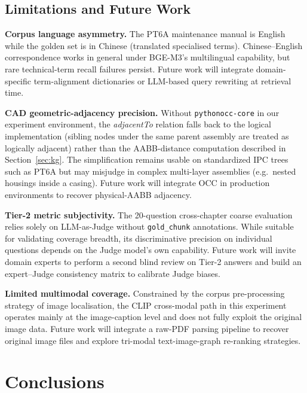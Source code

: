\documentclass[applsci,article,submit,pdftex,moreauthors]{Definitions/mdpi}
\begin{document}
\subsection{Limitations and Future Work}
\label{sec:disc-limit}

\textbf{Corpus language asymmetry.} The PT6A maintenance manual is English while the golden set is in Chinese (translated specialised terms). Chinese--English correspondence works in general under BGE-M3's multilingual capability, but rare technical-term recall failures persist. Future work will integrate domain-specific term-alignment dictionaries or LLM-based query rewriting at retrieval time.

\textbf{CAD geometric-adjacency precision.} Without \texttt{pythonocc-core} in our experiment environment, the \textit{adjacentTo} relation falls back to the logical implementation (sibling nodes under the same parent assembly are treated as logically adjacent) rather than the AABB-distance computation described in Section~\ref{sec:kg}. The simplification remains usable on standardized IPC trees such as PT6A but may misjudge in complex multi-layer assemblies (e.g.\ nested housings inside a casing). Future work will integrate OCC in production environments to recover physical-AABB adjacency.

\textbf{Tier-2 metric subjectivity.} The 20-question cross-chapter coarse evaluation relies solely on LLM-as-Judge without \texttt{gold\_chunk} annotations. While suitable for validating coverage breadth, its discriminative precision on individual questions depends on the Judge model's own capability. Future work will invite domain experts to perform a second blind review on Tier-2 answers and build an expert--Judge consistency matrix to calibrate Judge biases.

\textbf{Limited multimodal coverage.} Constrained by the corpus pre-processing strategy of image localisation, the CLIP cross-modal path in this experiment operates mainly at the image-caption level and does not fully exploit the original image data. Future work will integrate a raw-PDF parsing pipeline to recover original image files and explore tri-modal text-image-graph re-ranking strategies.

\section{Conclusions}
\label{sec:conclusion}
\end{document}

